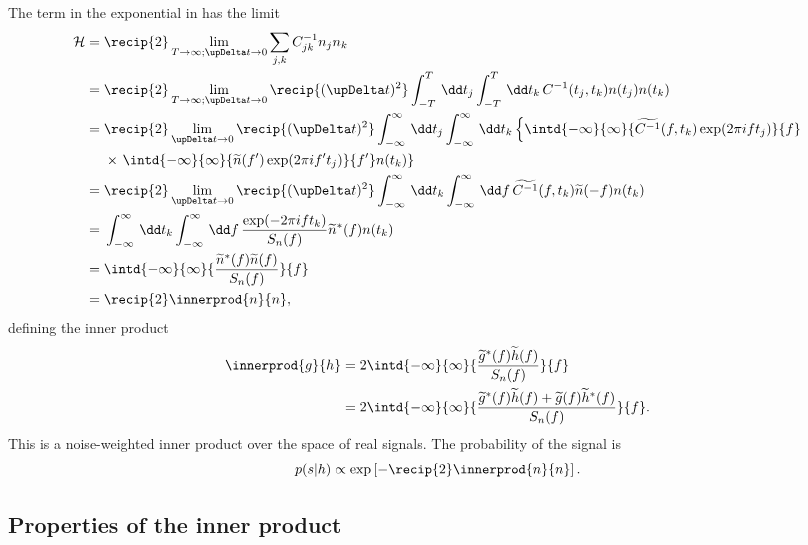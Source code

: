 The term in the exponential in  has the limit
\begin{align}
\mathcal{H} = {} & \recip{2}\lim_{T \rightarrow \infty; \upDelta t \rightarrow 0} \sum_{j,k}C^{-1}_{jk}n_j n_k \nonumber \\
 = {} & \recip{2}\lim_{T \rightarrow \infty; \upDelta t \rightarrow 0} \recip{(\upDelta t)^2}\int_{-T}^{T}\,\dd t_j \int_{-T}^{T}\,\dd t_k \, C^{-1}(t_j,t_k) n(t_j)n(t_k) \nonumber \\
 = {} & \recip{2}\lim_{\upDelta t \rightarrow 0} \recip{(\upDelta t)^2}\int_{-\infty}^{\infty}\,\dd t_j \int_{-\infty}^{\infty}\,\dd t_k \left\{ \intd{-\infty}{\infty}{\widetilde{C^{-1}}(f,t_k)\exp(2\pi if t_j)}{f} \right. \nonumber \\*
 {} & \times \left. \intd{-\infty}{\infty}{\widetilde{n}(f')\exp(2\pi i f't_j)}{f'}n(t_k)\right\} \nonumber \\
 = {} & \recip{2}\lim_{\upDelta t \rightarrow 0} \recip{(\upDelta t)^2} \int_{-\infty}^{\infty}\,\dd t_k \int_{-\infty}^{\infty}\,\dd f \, \widetilde{C^{-1}}(f,t_k)\widetilde{n}(-f)n(t_k) \nonumber \\
 = {} & \int_{-\infty}^{\infty}\,\dd t_k \int_{-\infty}^{\infty}\,\dd f \, \frac{\exp(-2\pi i f t_k)}{S_n(f)}\widetilde{n}^\ast(f)n(t_k) \nonumber \\
 = {} & \intd{-\infty}{\infty}{\frac{\widetilde{n}^\ast(f)\widetilde{n}(f)}{S_n(f)}}{f} \nonumber \\
 = {} & \recip{2}\innerprod{n}{n},
 \end{align}
defining the inner product
\begin{align}
\innerprod{g}{h} = {} & 2\intd{-\infty}{\infty}{\frac{\widetilde{g}^\ast(f)\widetilde{h}(f)}{S_n(f)}}{f} \\
 = {} & 2 \intd{-\infty}{\infty}{\frac{\widetilde{g}^\ast(f)\widetilde{h}(f) + \widetilde{g}(f)\widetilde{h}^\ast(f)}{S_n(f)}}{f}.
\end{align}
This is a noise-weighted inner product over the space of real signals. The probability of the signal is
\begin{equation}
p(s|h) \propto \exp\left[-\recip{2}\innerprod{n}{n}\right].
\end{equation}

\subsection{Properties of the inner product}

